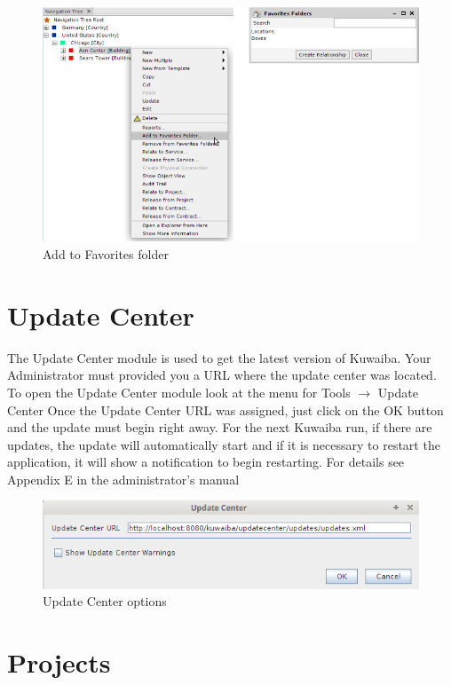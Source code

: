 \documentclass[a4paper]{article}
\begin{document}
			\begin{figure}[h!]
				\centering
				\includegraphics[width=0.8\linewidth]{img/favorites_add_to.png}
				\caption{Add to Favorites folder}
				\label{fig:favorites_add_to}
			\end{figure}
							
		\clearpage
		\section{Update Center}\label{sec:update_center}
		The Update Center module is used to get the latest version of Kuwaiba. Your Administrator must provided you a URL where the update center was located. To open the Update Center module look at the menu for Tools $\rightarrow$ Update Center
		\newline
		Once the Update Center URL was assigned, just click on the OK button and the update must begin right away. For the next Kuwaiba run, if there are updates, the update will automatically start and if it is necessary to restart the application, it will show a notification to begin restarting.
		\newline
		For details see Appendix E in the administrator's manual
		
		\begin{figure}[h!]
			\centering
			\includegraphics[width=0.7\linewidth]{img/update_center.png}
			\caption{Update Center options}
			\label{fig:update_center_options}
		\end{figure}		
		
		\clearpage		
		\section{Projects}\label{sec:projects}
		
\end{document}
